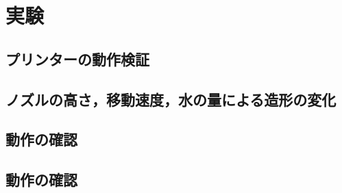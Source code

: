 \chapter{実験}
\label{chp:first}

\section{プリンターの動作検証}
\label{sec:paragraph}



\section{ノズルの高さ，移動速度，水の量による造形の変化}
\label{sec:paragraph}

\section{動作の確認}
\label{sec:paragraph}


\section{動作の確認}
\label{sec:paragraph}


